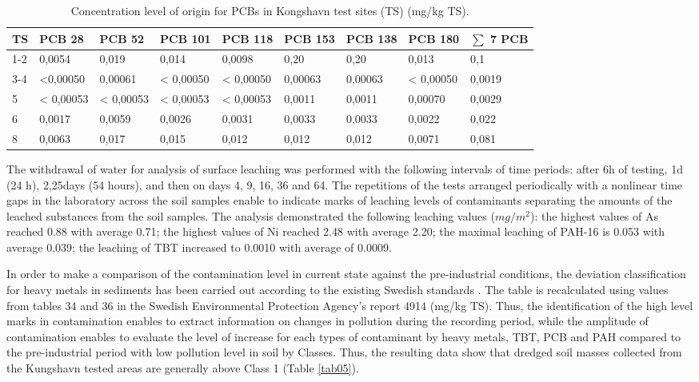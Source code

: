 \documentclass[algorithms,article,submit,pdftex,moreauthors]{Definitions/mdpi}
\begin{document}
\begin{table}[H] 
\caption{Concentration level of origin for PCBs in Kongshavn test sites (TS) (mg/kg TS).\label{tab03}}
\begin{tabularx}{\linewidth}{p{0.5cm}p{1.3cm}p{1.3cm}p{1.3cm}p{1.3cm}p{1.2cm}p{1.2cm}p{1.3cm}p{1.3cm}}
\toprule
\textbf{TS} & \textbf{PCB 28} & \textbf{PCB 52} & \textbf{PCB 101} & \textbf{PCB 118} & \textbf{PCB 153} & \textbf{PCB 138} & \textbf{PCB 180} & \textbf{$\sum$ 7 PCB}\\
\midrule
1-2 & 0,0054   & 0,019     & 0,014 	     & 0,0098  & 0,20        & 0,20       & 0,013         & 0,1 \\
3-4 & <0,00050 & 0,00061 & < 0,00050    & < 0,00050 & 0,00063 & 0,00063 & < 0,00050 & 0,0019 \\
5 & < 0,00053 & < 0,00053  & < 0,00053  & < 0,00053 & 0,0011   & 0,0011     & 0,00070     & 0,0029 \\
6 & 0,0017   & 0,0059 	& 0,0026       & 0,0031  & 0,0033  & 0,0033      & 0,0022      & 0,022 \\
8 & 0,0063   & 0,017 	& 0,015         & 0,012     & 0,012    & 0,012      & 0,0071      & 0,081\\
\bottomrule
\end{tabularx}
\end{table}

The withdrawal of water for analysis of surface leaching was performed with the following intervals of time periods: after 6h of testing, 1d (24 h), 2,25days (54 hours), and then on days 4, 9, 16, 36 and 64. The repetitions of the tests arranged periodically with a nonlinear time gaps in the laboratory across the soil samples enable to indicate marks of leaching levels of contaminants separating the amounts of the leached substances from the soil samples. The analysis demonstrated the following leaching values ($mg/m^2$): the highest values of As reached 0.88 with average 0.71; the highest values of Ni reached 2.48 with average 2.20; the maximal leaching of PAH-16 is 0.053 with average 0.039; the leaching of TBT increased to 0.0010 with average of 0.0009. 

In order to make a comparison of the contamination level in current state against the pre-industrial conditions, the deviation classification for heavy metals in sediments has been carried out according to the existing Swedish standards \cite{ZefferSamuelsson}. The table is recalculated using values from tables 34 and 36 in the Swedish Environmental Protection Agency's report 4914 (mg/kg TS). Thus, the identification of the high level marks in contamination enables to extract information on changes in pollution during the recording period, while the amplitude of contamination enables to evaluate the level of increase for each types of contaminant by heavy metals, TBT, PCB and PAH compared to the pre-industrial period with low pollution level in soil by Classes. Thus, the resulting data show that dredged soil masses collected from the Kungshavn tested areas are generally above Class 1 (Table \ref{tab05}). 
\end{document}
